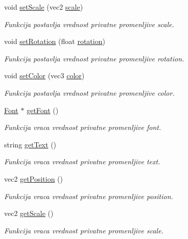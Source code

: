 \begin{DoxyCompactItemize}
void \hyperlink{classfont_1_1Text_ab2162e943ec0ab36a19a2762e1352369}{set\+Scale} (vec2 \hyperlink{classfont_1_1Text_aec4f985d466d9f4b10cc426e393d6f14}{scale})
\begin{DoxyCompactList}\small\item\em Funkcija postavlja vrednost privatne promenljive scale. \end{DoxyCompactList}\item 
void \hyperlink{classfont_1_1Text_a4687ff4053103b3fdf730fd8585aea7e}{set\+Rotation} (float \hyperlink{classfont_1_1Text_a4dc0a823fa5a8592b6d09e90b18226fb}{rotation})
\begin{DoxyCompactList}\small\item\em Funkcija postavlja vrednost privatne promenljive rotation. \end{DoxyCompactList}\item 
void \hyperlink{classfont_1_1Text_a650c183619f7f2a41ef7cb9a50d04f05}{set\+Color} (vec3 \hyperlink{classfont_1_1Text_a83c69eadc420a466aaade60393f35b24}{color})
\begin{DoxyCompactList}\small\item\em Funkcija postavlja vrednost privatne promenljive color. \end{DoxyCompactList}\item 
\hyperlink{classfont_1_1Font}{Font} $\ast$ \hyperlink{classfont_1_1Text_a8ef804f199ccc299a180ad82e588fa38}{get\+Font} ()
\begin{DoxyCompactList}\small\item\em Funkcija vraca vrednost privatne promenljive font. \end{DoxyCompactList}\item 
string \hyperlink{classfont_1_1Text_ae78670d785e8071d66298c84bcf89330}{get\+Text} ()
\begin{DoxyCompactList}\small\item\em Funkcija vraca vrednost privatne promenljive text. \end{DoxyCompactList}\item 
vec2 \hyperlink{classfont_1_1Text_a6d9c2d80d02c59ce0811190ba0ee5cb8}{get\+Position} ()
\begin{DoxyCompactList}\small\item\em Funkcija vraca vrednost privatne promenljive position. \end{DoxyCompactList}\item 
vec2 \hyperlink{classfont_1_1Text_af94e22a422e17028fef39e69b46736f3}{get\+Scale} ()
\begin{DoxyCompactList}\small\item\em Funkcija vraca vrednost privatne promenljive scale. \end{DoxyCompactList}\item 

\end{DoxyCompactItemize}
